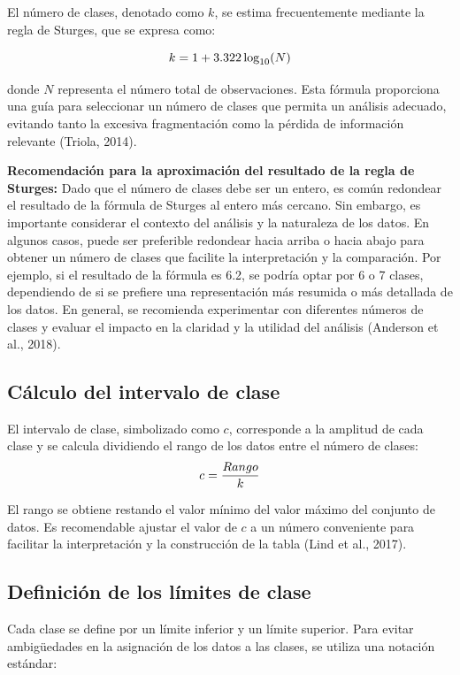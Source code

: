 \documentclass[
  spanish,
  letterpaper,
]{book}
\begin{document}
El número de clases, denotado como \(k\), se estima frecuentemente
mediante la regla de Sturges, que se expresa como:

\[\huge k = 1 + 3.322 \log_{10}(N)\]

donde \(N\) representa el número total de observaciones. Esta fórmula
proporciona una guía para seleccionar un número de clases que permita un
análisis adecuado, evitando tanto la excesiva fragmentación como la
pérdida de información relevante (Triola, 2014).

\textbf{Recomendación para la aproximación del resultado de la regla de
Sturges:} Dado que el número de clases debe ser un entero, es común
redondear el resultado de la fórmula de Sturges al entero más cercano.
Sin embargo, es importante considerar el contexto del análisis y la
naturaleza de los datos. En algunos casos, puede ser preferible
redondear hacia arriba o hacia abajo para obtener un número de clases
que facilite la interpretación y la comparación. Por ejemplo, si el
resultado de la fórmula es 6.2, se podría optar por 6 o 7 clases,
dependiendo de si se prefiere una representación más resumida o más
detallada de los datos. En general, se recomienda experimentar con
diferentes números de clases y evaluar el impacto en la claridad y la
utilidad del análisis (Anderson et al., 2018).

\subsection{Cálculo del intervalo de
clase}\label{cuxe1lculo-del-intervalo-de-clase}

El intervalo de clase, simbolizado como \(c\), corresponde a la amplitud
de cada clase y se calcula dividiendo el rango de los datos entre el
número de clases: \[\huge
c = \frac{Rango}{k}
\]

El rango se obtiene restando el valor mínimo del valor máximo del
conjunto de datos. Es recomendable ajustar el valor de \(c\) a un número
conveniente para facilitar la interpretación y la construcción de la
tabla (Lind et al., 2017).

\subsection{Definición de los límites de
clase}\label{definiciuxf3n-de-los-luxedmites-de-clase}

Cada clase se define por un límite inferior y un límite superior. Para
evitar ambigüedades en la asignación de los datos a las clases, se
utiliza una notación estándar:
\end{document}
